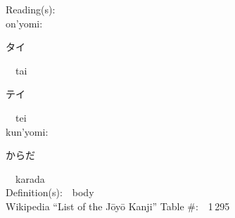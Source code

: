 \begin{multicols}{2}
Reading(s):\ \ \\
{\hspace*{1em}}on'yomi:\ \ \\
{\hspace*{2em}}{\begin{CJK}{UTF8}{min} タイ \end{CJK}}\ \ tai\ \ \\
{\hspace*{2em}}{\begin{CJK}{UTF8}{min} テイ \end{CJK}}\ \ tei\ \ \\
{\hspace*{1em}}kun'yomi:\ \ \\
{\hspace*{2em}}{\begin{CJK}{UTF8}{min} からだ \end{CJK}}\ \ karada\ \ \\
Definition(s):\ \ body \\
Wikipedia ``List of the J\=oy\=o Kanji'' Table \#:\ \ 1\,295 \\
\ \ \\
\end{multicols}



